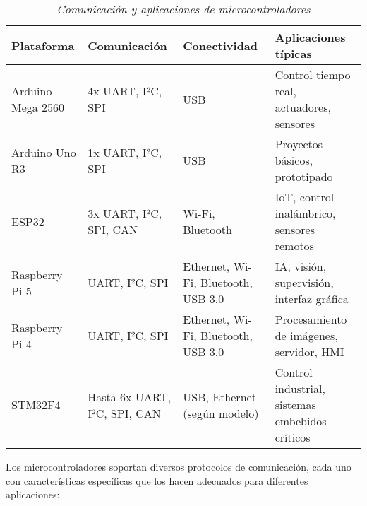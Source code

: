 \begin{table}[H]
\centering
\small
\begin{tabular}{|p{2.5cm}|p{3cm}|p{3cm}|p{4cm}|}
\hline
\textbf{Plataforma} & \textbf{Comunicación} & \textbf{Conectividad} & \textbf{Aplicaciones típicas} \\
\hline
Arduino Mega 2560 & 4x UART, I²C, SPI & USB & Control tiempo real, actuadores, sensores \\
\hline
Arduino Uno R3 & 1x UART, I²C, SPI & USB & Proyectos básicos, prototipado \\
\hline
ESP32 & 3x UART, I²C, SPI, CAN & Wi-Fi, Bluetooth & IoT, control inalámbrico, sensores remotos \\
\hline
Raspberry Pi 5 & UART, I²C, SPI & Ethernet, Wi-Fi, Bluetooth, USB 3.0 & IA, visión, supervisión, interfaz gráfica \\
\hline
Raspberry Pi 4 & UART, I²C, SPI & Ethernet, Wi-Fi, Bluetooth, USB 3.0 & Procesamiento de imágenes, servidor, HMI \\
\hline
STM32F4 & Hasta 6x UART, I²C, SPI, CAN & USB, Ethernet (según modelo) & Control industrial, sistemas embebidos críticos \\
\hline
\end{tabular}
\caption{\textit{Comunicación y aplicaciones de microcontroladores}}
\label{tab:aplicaciones_micros}
\end{table}

Los microcontroladores soportan diversos protocolos de comunicación, cada uno con características específicas que los hacen adecuados para diferentes aplicaciones:

